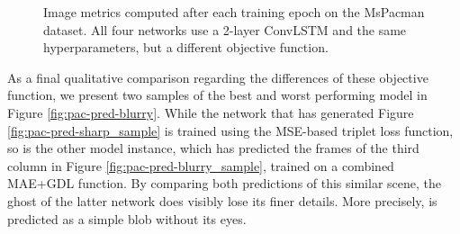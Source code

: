 \begin{figure}[htb]
\begin{subfigure}{0.5\textwidth}
{
  }
  \caption{}
  \label{fig:plot-pac-loss-ssim}
\end{subfigure}
\caption[Comparison of Image Metrics on MsPacman]{Image metrics computed after each training epoch on the MsPacman dataset. All four networks use a 2-layer ConvLSTM and the same hyperparameters, but a different objective function.} \label{fig:plot-pac-imgmetric}
\end{figure}

As a final qualitative comparison regarding the differences of these objective function, we present two samples of the best and worst performing model in Figure \ref{fig:pac-pred-blurry}. While the network that has generated Figure \ref{fig:pac-pred-sharp_sample} is trained using the MSE-based triplet loss function, so is the other model instance, which has predicted the frames of the third column in Figure \ref{fig:pac-pred-blurry_sample}, trained on a combined MAE+GDL function. By comparing both predictions of this similar scene, the ghost of the latter network does visibly lose its finer details. More precisely, is predicted as a simple blob without its eyes. 

